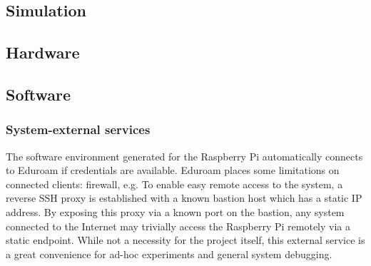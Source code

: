 \subsection{Simulation}

\subsection{Hardware}

\subsection{Software}

\subsubsection{System-external services}
The software environment generated for the Raspberry Pi automatically connects to Eduroam if credentials are available.
Eduroam places some limitations on connected clients: firewall, e.g.
To enable easy remote access to the system, a reverse SSH proxy is established with a known bastion host which has a static IP address.
By exposing this proxy via a known port on the bastion, any system connected to the Internet may trivially access the Raspberry Pi remotely via a static endpoint.
While not a necessity for the project itself, this external service is a great convenience for ad-hoc experiments and general system debugging.

